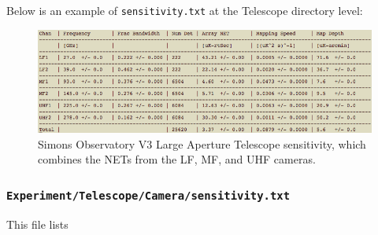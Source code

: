 \documentclass[11pt]{article} %
\begin{document}
Below is an example of \texttt{sensitivity.txt} at the Telescope directory level:

\begin{figure}[h!]
	\centering
	\includegraphics[width=1.0\textwidth]{Telescope_sensEx}
	\caption{Simons Observatory V3 Large Aperture Telescope sensitivity, which combines the NETs from the LF, MF, and UHF cameras. \label{telSens}}
\end{figure}


\subsubsection{\texttt{Experiment/Telescope/Camera/sensitivity.txt}}

This file lists
\end{document}
